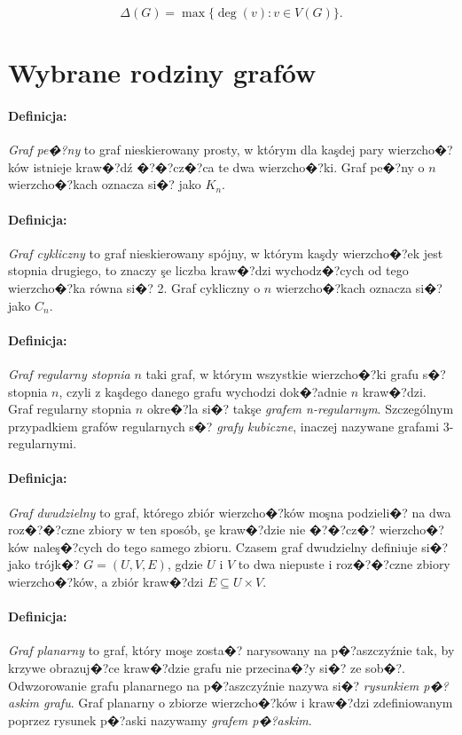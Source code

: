 \documentclass[12pt,a4paper]{mwrep}
\begin{document}
\begin{equation}
\Delta(G)  = \operatorname{max} \{ \deg(v): v \in V(G) \}.
\end{equation}

\section{Wybrane rodziny grafów}

\paragraph{Definicja:} \emph{Graf pe�?ny} to graf nieskierowany prosty, 
w którym dla kaşdej pary wierzcho�?ków 
istnieje kraw�?dź �?�?cz�?ca te dwa wierzcho�?ki. 
Graf pe�?ny o $n$ wierzcho�?kach oznacza si�? jako ${K_n}$.

\paragraph{Definicja:} \emph{Graf cykliczny} to graf nieskierowany spójny,
w którym kaşdy wierzcho�?ek jest stopnia drugiego, 
to znaczy şe liczba kraw�?dzi wychodz�?cych od tego wierzcho�?ka równa si�? 2.
Graf cykliczny o $n$ wierzcho�?kach oznacza si�? jako ${C_n}$.

\paragraph{Definicja:} \emph{Graf regularny stopnia} $n$ taki graf, w którym 
wszystkie wierzcho�?ki grafu s�? stopnia $n$, czyli z kaşdego danego grafu wychodzi
dok�?adnie $n$ kraw�?dzi. Graf regularny stopnia $n$ okre�?la si�? takşe \emph{grafem n-regularnym}. 
Szczególnym przypadkiem grafów regularnych s�? \emph{grafy kubiczne}, inaczej nazywane 
grafami 3-regularnymi.

\paragraph{Definicja:} \emph{Graf dwudzielny} to graf, którego zbiór 
wierzcho�?ków moşna podzieli�? na dwa roz�?�?czne zbiory w ten sposób, 
şe kraw�?dzie nie �?�?cz�? wierzcho�?ków naleş�?cych do tego samego zbioru. 
Czasem graf dwudzielny definiuje si�? jako trójk�? $G=(U, V, E)$, 
gdzie $U$ i $V$ to dwa niepuste i roz�?�?czne zbiory wierzcho�?ków, 
a zbiór kraw�?dzi $E \subseteq  U \times  V$.

\paragraph{Definicja:} \emph{Graf planarny} to graf, który moşe zosta�? narysowany na p�?aszczyźnie tak,
by krzywe obrazuj�?ce kraw�?dzie grafu nie przecina�?y si�? ze sob�?. Odwzorowanie grafu planarnego na 
p�?aszczyźnie nazywa si�? \emph{rysunkiem p�?askim grafu}. Graf planarny o zbiorze wierzcho�?ków i kraw�?dzi
zdefiniowanym poprzez rysunek p�?aski nazywamy \emph{grafem p�?askim}.
\end{document}
